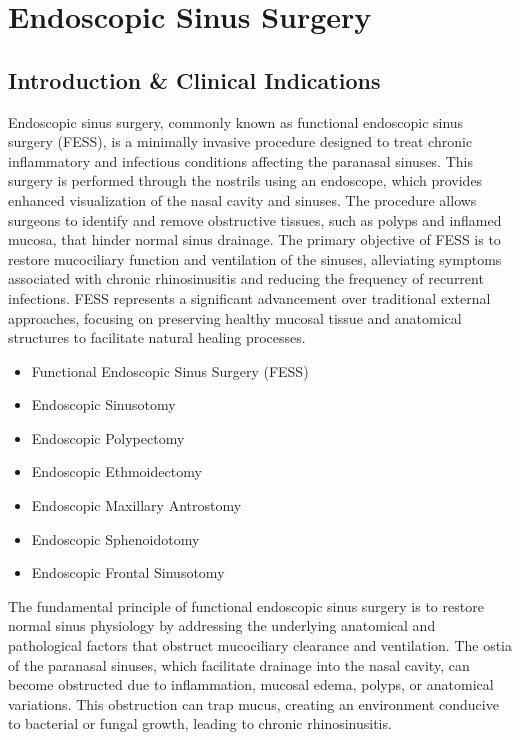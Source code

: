 \chapter{Endoscopic Sinus Surgery}

\section*{Introduction \& Clinical Indications}
Endoscopic sinus surgery, commonly known as functional endoscopic sinus surgery (FESS), is a minimally invasive procedure designed to treat chronic inflammatory and infectious conditions affecting the paranasal sinuses. This surgery is performed through the nostrils using an endoscope, which provides enhanced visualization of the nasal cavity and sinuses. The procedure allows surgeons to identify and remove obstructive tissues, such as polyps and inflamed mucosa, that hinder normal sinus drainage. The primary objective of FESS is to restore mucociliary function and ventilation of the sinuses, alleviating symptoms associated with chronic rhinosinusitis and reducing the frequency of recurrent infections. FESS represents a significant advancement over traditional external approaches, focusing on preserving healthy mucosal tissue and anatomical structures to facilitate natural healing processes.

\begin{itemize}
  \item Functional Endoscopic Sinus Surgery (FESS)
  \item Endoscopic Sinusotomy
  \item Endoscopic Polypectomy
  \item Endoscopic Ethmoidectomy
  \item Endoscopic Maxillary Antrostomy
  \item Endoscopic Sphenoidotomy
  \item Endoscopic Frontal Sinusotomy
\end{itemize}

The fundamental principle of functional endoscopic sinus surgery is to restore normal sinus physiology by addressing the underlying anatomical and pathological factors that obstruct mucociliary clearance and ventilation. The ostia of the paranasal sinuses, which facilitate drainage into the nasal cavity, can become obstructed due to inflammation, mucosal edema, polyps, or anatomical variations. This obstruction can trap mucus, creating an environment conducive to bacterial or fungal growth, leading to chronic rhinosinusitis.


